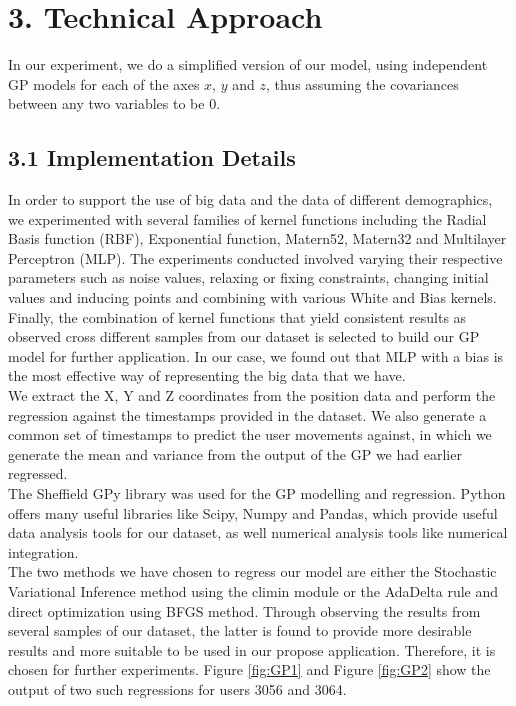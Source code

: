 \documentclass[letterpaper]{article}
\begin{document}
\section{3.  Technical Approach}

In our experiment, we do a simplified version of our model, using independent GP models for each of the axes $x$, $y$ and $z$, thus assuming the covariances between any two variables to be $0$. \\

\subsection{3.1  Implementation Details}

In order to support the use of big data and the data of different demographics, we experimented with several families of kernel functions including the Radial Basis function (RBF), Exponential function, Matern52, Matern32 and Multilayer Perceptron (MLP). The experiments conducted involved varying their respective parameters such as noise values, relaxing or fixing constraints, changing initial values and inducing points and combining with various White and Bias kernels. Finally, the combination of kernel functions that yield consistent results as observed cross different samples from our dataset is selected to build our GP model for further application. In our case, we found out that MLP with a bias is the most effective way of representing the big data that we have.\\

We extract the X, Y and Z coordinates from the position data and perform the regression against the timestamps provided in the dataset. We also generate a common set of timestamps to predict the user movements against, in which we generate the mean and variance from the output of the GP we had earlier regressed. \\

The Sheffield GPy library was used for the GP modelling and regression. Python offers many useful libraries like Scipy, Numpy and Pandas, which provide useful data analysis tools for our dataset, as well numerical analysis tools like numerical integration.\\

The two methods we have chosen to regress our model are either the Stochastic Variational Inference method using the climin module or the AdaDelta rule and direct optimization using BFGS method. Through observing the results from several samples of our dataset, the latter is found to provide more desirable results and more suitable to be used in our propose application. Therefore, it is chosen for further experiments. Figure \ref{fig:GP1} and Figure \ref{fig:GP2} show the output of two such regressions for users 3056 and 3064.
\end{document}
